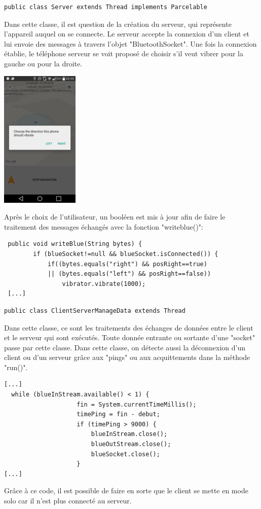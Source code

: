 \begin{lstlisting}
public class Server extends Thread implements Parcelable 
\end{lstlisting} 

Dans cette classe, il est question de la création du serveur, qui représente l'appareil auquel on se connecte. Le serveur accepte la connexion d'un client et lui envoie des messages à travers l'objet "BluetoothSocket". Une fois la connexion établie, le téléphone serveur se voit proposé de choisir s'il veut vibrer pour la gauche ou pour la droite.

\begin{center}
\includegraphics[height=250px]{Assets/Server.png}
\end{center}

Après le choix de l'utilisateur, un booléen est mis à jour afin de faire le traitement des messages échangés avec la fonction "writeblue()": 

\begin{lstlisting}
 public void writeBlue(String bytes) {
        if (blueSocket!=null && blueSocket.isConnected()) {
            if((bytes.equals("right") && posRight==true)
            || (bytes.equals("left") && posRight==false))
                vibrator.vibrate(1000);
 [...]
\end{lstlisting} 

\begin{lstlisting}
public class ClientServerManageData extends Thread 
\end{lstlisting}

Dans cette classe, ce sont les traitements des échanges de données entre le client et le serveur qui sont exécutés. Toute donnée entrante ou sortante d'une "socket" passe par cette classe.
Dans cette classe, on détecte aussi la déconnexion d'un client ou d'un serveur grâce aux "pings" ou aux acquittements dans la méthode "run()".

\begin{lstlisting}
[...]
  while (blueInStream.available() < 1) {
                    fin = System.currentTimeMillis();
                    timePing = fin - debut;
                    if (timePing > 9000) {
                        blueInStream.close();
                        blueOutStream.close();
                        blueSocket.close();    
                    }
[...]                    
\end{lstlisting}

Grâce à ce code, il est possible de faire en sorte que le client se mette en mode solo car il n'est plus connecté au serveur.